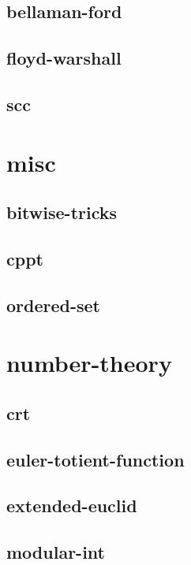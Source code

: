 \documentclass[a4paper, twocolumn]{article}
\begin{document}
\subsection{bellaman-ford}

\subsection{floyd-warshall}

\subsection{scc}

\section{misc}
\subsection{bitwise-tricks}

\subsection{cppt}

\subsection{ordered-set}

\section{number-theory}
\subsection{crt}

\subsection{euler-totient-function}

\subsection{extended-euclid}

\subsection{modular-int}

\end{document}
